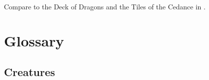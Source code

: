Compare to the Deck of Dragons and the Tiles of the Cedance in \cite{StevenEriksonIanCameronEsslemont:MalazanBookoftheFallen}. 
 














\section{Glossary}









\subsection{Creatures}









